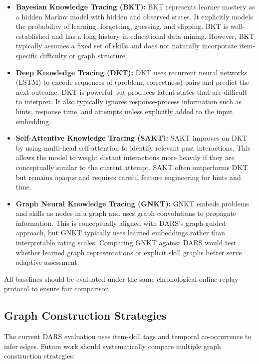 \documentclass[conference]{IEEEtran}
\begin{document}
\begin{itemize}
    \item \textbf{Bayesian Knowledge Tracing (BKT):} BKT represents learner mastery as a hidden Markov model with hidden and observed states. It explicitly models the probability of learning, forgetting, guessing, and slipping. BKT is well-established and has a long history in educational data mining. However, BKT typically assumes a fixed set of skills and does not naturally incorporate item-specific difficulty or graph structure.
    
    \item \textbf{Deep Knowledge Tracing (DKT):} DKT uses recurrent neural networks (LSTM) to encode sequences of (problem, correctness) pairs and predict the next outcome. DKT is powerful but produces latent states that are difficult to interpret. It also typically ignores response-process information such as hints, response time, and attempts unless explicitly added to the input embedding.
    
    \item \textbf{Self-Attentive Knowledge Tracing (SAKT):} SAKT improves on DKT by using multi-head self-attention to identify relevant past interactions. This allows the model to weight distant interactions more heavily if they are conceptually similar to the current attempt. SAKT often outperforms DKT but remains opaque and requires careful feature engineering for hints and time.
    
    \item \textbf{Graph Neural Knowledge Tracing (GNKT):} GNKT embeds problems and skills as nodes in a graph and uses graph convolutions to propagate information. This is conceptually aligned with DARS's graph-guided approach, but GNKT typically uses learned embeddings rather than interpretable rating scales. Comparing GNKT against DARS would test whether learned graph representations or explicit skill graphs better serve adaptive assessment.
\end{itemize}

All baselines should be evaluated under the same chronological online-replay protocol to ensure fair comparison.

\subsection{Graph Construction Strategies}
The current DARS evaluation uses item-skill tags and temporal co-occurrence to infer edges. Future work should systematically compare multiple graph construction strategies:
\end{document}
